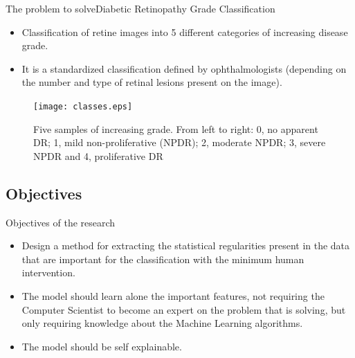 \documentclass{beamer}
\begin{document}
\begin{frame}{The problem to solve}{Diabetic Retinopathy Grade Classification}
	\begin{itemize}
		\item {Classification of retine images into 5 different categories of increasing disease grade.}
		\item {It is a standardized classification defined by ophthalmologists (depending on the number and type of retinal lesions present on the image).}
	\end{itemize}
	\begin{figure}[p]
		\texttt{[image: classes.eps]}
		\caption{Five samples of increasing grade. From left to right: 0, no apparent DR; 1, mild non-proliferative (NPDR); 2, moderate NPDR; 3, severe NPDR and 4, proliferative DR}
	\end{figure}	
\end{frame}

\subsection{Objectives}

\begin{frame}{Objectives of the research}
	\begin{itemize}
		\item {
			Design a method for extracting the statistical regularities present in the data that are important for the classification with the minimum human intervention.
		}
		\item {The model should learn alone the important features, not requiring the Computer Scientist to become an expert on the problem that is solving, but only requiring knowledge about the Machine Learning algorithms.}
		\item {The model should be self explainable.}
	\end{itemize}
\end{frame}
\end{document}
